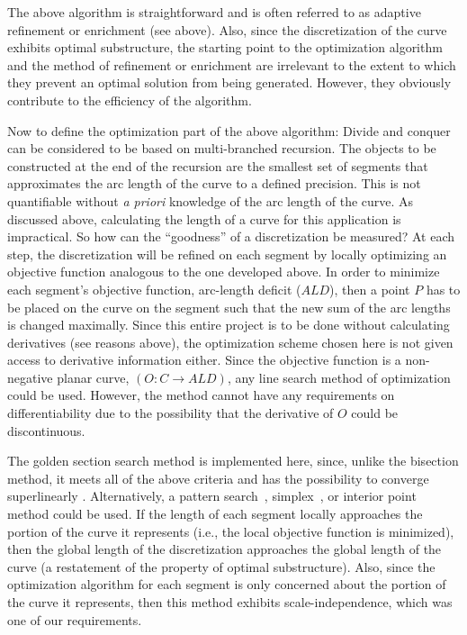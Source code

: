 The above algorithm is straightforward and is often referred to as 
adaptive refinement or enrichment (see above). Also, since the 
discretization of the curve exhibits optimal substructure, the starting 
point to the optimization algorithm and the method of refinement or 
enrichment are irrelevant to the extent to which they prevent an optimal 
solution from being generated. However, they obviously contribute 
to the efficiency of the algorithm.

Now to define the optimization part of the above algorithm: Divide and 
conquer can be considered to be based on multi-branched recursion. The 
objects to be constructed at the end of the recursion are the smallest set 
of segments that approximates the arc length of the curve to a defined 
precision. This is not quantifiable without {\it{a priori}} knowledge 
of the arc length of the curve. As discussed above, calculating the length 
of a curve for this application is impractical. So how can the 
``goodness'' of a discretization be measured?  At each step, the 
discretization will be refined on each segment by locally optimizing an 
objective function analogous to the one developed above. In order to 
minimize each segment's objective function, arc-length deficit ($ALD$), 
then a point $P$ has to be placed on the curve on the segment such 
that the new sum of the arc lengths is changed maximally. Since this 
entire project is to be done without calculating derivatives (see reasons 
above), the optimization scheme chosen here is not given access to 
derivative information either. Since the objective function is a 
non-negative planar curve, $(O: C \rightarrow ALD)$, any line search 
method of optimization could be used. However, the method cannot have any 
requirements on differentiability due to the possibility that the 
derivative of $O$ could be discontinuous.

The golden section search method is implemented here, since, unlike the 
bisection method, it meets all of the above criteria and has the 
possibility to converge superlinearly \cite{brent73}.  Alternatively, a 
pattern search~\cite{hopspack}, simplex~\cite{dantzig1,dantzig2}, or 
interior point~\cite{karmarkar} method could be used.  If 
the length of each segment 
locally approaches the portion of the curve it represents (i.e., the 
local objective function is 
minimized), then the global length of the discretization approaches the 
global length of the curve (a restatement of the property of optimal 
substructure). Also, since the optimization algorithm for each segment is 
only concerned about the portion of the curve it represents, then this 
method exhibits scale-independence, which was one of our requirements.

